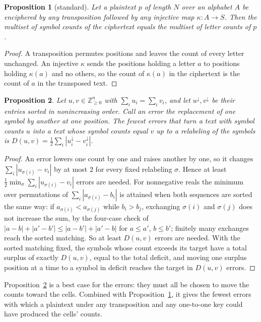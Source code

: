 \documentclass[11pt]{article}
\newtheorem{proposition}{Proposition}
\theoremstyle{definition}
\begin{document}
\begin{proposition}[standard]\label{prop:counts}
Let a plaintext $p$ of length $N$ over an alphabet $A$ be enciphered by any transposition followed by any injective map $\kappa\colon A \to S$. Then the multiset of symbol counts of the ciphertext equals the multiset of letter counts of $p$.
\end{proposition}

\begin{proof}
A transposition permutes positions and leaves the count of every letter unchanged. An injective $\kappa$ sends the positions holding a letter $a$ to positions holding $\kappa(a)$ and no others, so the count of $\kappa(a)$ in the ciphertext is the count of $a$ in the transposed text.
\end{proof}

\begin{proposition}\label{prop:errors}
Let $u, v \in \mathbb{Z}_{\ge 0}^{n}$ with $\sum_i u_i = \sum_i v_i$, and let $u^{\downarrow}, v^{\downarrow}$ be their entries sorted in nonincreasing order. Call an error the replacement of one symbol by another at one position. The fewest errors that turn a text with symbol counts $u$ into a text whose symbol counts equal $v$ up to a relabeling of the symbols is $D(u, v) = \tfrac12 \sum_i |u^{\downarrow}_i - v^{\downarrow}_i|$.
\end{proposition}

\begin{proof}
An error lowers one count by one and raises another by one, so it changes $\sum_i |u_{\sigma(i)} - v_i|$ by at most $2$ for every fixed relabeling $\sigma$. Hence at least $\tfrac12 \min_\sigma \sum_i |u_{\sigma(i)} - v_i|$ errors are needed. For nonnegative reals the minimum over permutations of $\sum_i |a_{\sigma(i)} - b_i|$ is attained when both sequences are sorted the same way: if $a_{\sigma(i)} < a_{\sigma(j)}$ while $b_i > b_j$, exchanging $\sigma(i)$ and $\sigma(j)$ does not increase the sum, by the four-case check of $|a - b| + |a' - b'| \le |a - b'| + |a' - b|$ for $a \le a'$, $b \le b'$; finitely many exchanges reach the sorted matching. So at least $D(u, v)$ errors are needed. With the sorted matching fixed, the symbols whose count exceeds its target have a total surplus of exactly $D(u, v)$, equal to the total deficit, and moving one surplus position at a time to a symbol in deficit reaches the target in $D(u, v)$ errors.
\end{proof}

Proposition~\ref{prop:errors} is a best case for the errors: they must all be chosen to move the counts toward the cells. Combined with Proposition~\ref{prop:counts}, it gives the fewest errors with which a plaintext under any transposition and any one-to-one key could have produced the cells' counts.
\end{document}
